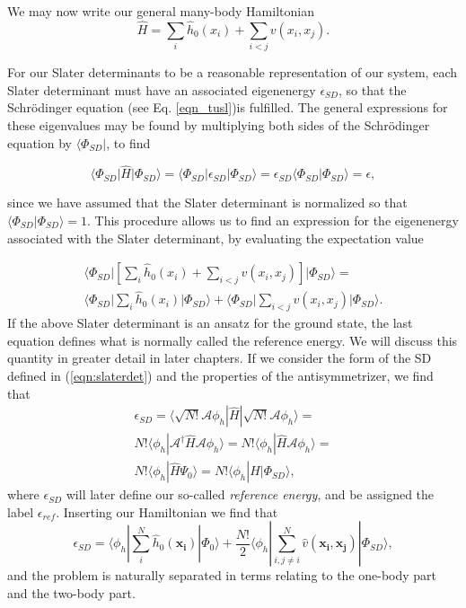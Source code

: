 We may now write our general many-body Hamiltonian
\begin{equation}
\hat{H} = \sum_i \hat{h}_0(x_i) + \sum_{i<j} v(x_i, x_j).
\label{eqn:general_hamiltonian}
\end{equation}

For our Slater determinants to be a reasonable representation of our system, each Slater determinant must have an associated eigenenergy $\epsilon_{SD}$, so that the Schrödinger equation (see Eq. \ref{eqn_tusl})is fulfilled. The general expressions for these eigenvalues may be found by multiplying both sides of the Schrödinger equation by $\langle \Phi_{SD} \vert$, to find

\begin{equation}
\langle \Phi_{SD} \vert \hat{H} \vert \Phi_{SD} \rangle = \langle \Phi_{SD} \vert \epsilon_{SD} \vert \Phi_{SD} \rangle = \epsilon_{SD}  \langle \Phi_{SD} \vert \Phi_{SD} \rangle = \epsilon,
\label{eqn:refee}
\end{equation}

since we have assumed that the Slater determinant is normalized so that $\langle \Phi_{SD} \vert \Phi_{SD} \rangle = 1$. This procedure allows us to find an expression for the eigenenergy associated with the Slater determinant, by evaluating the expectation value

\begin{multline}
\langle \Phi_{SD}  \vert [\sum_i \hat{h}_0(x_i) + \sum_{i<j} v(x_i, x_j)] \vert \Phi_{SD} \rangle = \\
 \langle \Phi_{SD} \vert   \sum_i \hat{h}_0(x_i) \vert \Phi_{SD} \rangle + \langle \Phi_{SD} \vert  \sum_{i<j} v(x_i, x_j) \vert \Phi_{SD} \rangle.
\label{eqn:TUSL_sol2}
\end{multline}
If the above Slater determinant is an ansatz for the ground state, the last equation defines what is normally called the reference energy. We will discuss this quantity in greater detail in later chapters.
If we consider the form of the SD defined in (\ref{eqn:slaterdet}) and the properties of the antisymmetrizer, we find that
\begin{multline}
    \epsilon_{SD} = \langle \sqrt{N!} \mathcal{A} \phi _h | \hat{H} | \sqrt{N!} \mathcal{A} \phi _h \rangle = \\
    N!\langle \phi _h | \mathcal{A}^{\dagger} \hat{H} \mathcal{A} \phi _h \rangle = N!\langle \phi _h | \hat{H}\mathcal{A}\phi _h \rangle = \\ 
    N!\langle \phi _h |\hat{H} \Psi _0 \rangle  = N!\langle \phi _h |\hat{H} | \Phi _{SD} \rangle, 
 \label{eqn:groundstate}
\end{multline}
where $\epsilon_{SD}$ will later define our so-called \emph{reference energy}, and be assigned the label $\epsilon_{ref}$. 
Inserting our Hamiltonian we find that
\begin{equation}
\epsilon _{SD} = \langle \phi _h | \sum _i^N \hat{h}_0(\mathbf{x_i}) | \Phi _0\rangle + \frac{N!}{2}\langle \phi _h | \sum _{i,j\neq i}^N \hat{v}(\mathbf{x_i}, \mathbf{x_j}) | \Phi _{SD} \rangle,
 \label{eqn:convinient_groundstate}
\end{equation}
and the problem is naturally separated in terms relating to the one-body 
part and the two-body part. 


